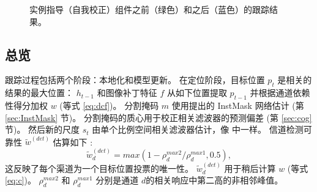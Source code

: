 \begin{figure}
                       \hspace{-0.6em}
                       \hspace{-0.6em}
    \caption{实例指导（自我校正）组件之前（绿色）和之后（蓝色）的跟踪结果。}
    \label{fig:IGSC}
\end{figure}

\subsection{总览}
跟踪过程包括两个阶段：本地化和模型更新。
在定位阶段，目标位置 $p_t$ 是相关的结果的最大位置： $h_{t-1}$ 和图像补丁特征 $f$ 从如下位置提取 $p_{t-1}$ 并根据通道依赖性得分加权 $w$ (等式 \ref{eq:dcf})。
分割掩码 $m$ 使用提出的 InstMask 网络估计 (第 \ref{sec:InstMask} 节)。
分割掩码的质心用于校正相关滤波器的预测偏差 (第 \ref{sec:cog} 节)。
然后新的尺度 $s_t$ 由单个比例空间相关滤波器估计，像 \cite{Danelljan2014AccurateSE} 中一样。
信道检测可靠性 $\tilde{w}^{(det)}$ 估算如下 \cite{Lukezic2017DiscriminativeCF}:
\begin{equation} \label{eq:det}
\tilde w_d^{(det)} = max(1 - \rho_d^{max2} / \rho_d^{max1}, 0.5),
\end{equation}
这反映了每个渠道为一个目标位置投票的唯一性。 $\tilde w_d^{(det)}$ 用于稍后计算 $w$ (等式 \ref{eq:c})。 $\rho_d^{max2}$ 和 $\rho_d^{max1}$ 分别是通道 $d$的相关响应中第二高的非相邻峰值。

